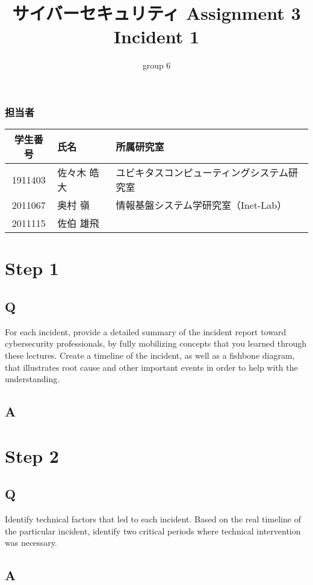 \documentclass[uplatex]{jsarticle}
\title{
    \vspace{-1.5cm}
    サイバーセキュリティ Assignment 3 \\
    Incident 1
}
\author{group 6}
\begin{document}
\maketitle

\subsubsection*{担当者}
\begin{table}[H]
    \begin{tabular}{|c|l|l|}
        \hline
        学生番号 & 氏名 & 所属研究室\\
        \hline\hline
        1911403 & 佐々木 皓大 & ユビキタスコンピューティングシステム研究室\\
        \hline
        2011067 & 奥村 嶺 & 情報基盤システム学研究室（Inet-Lab）\\
        \hline
        2011115 & 佐伯 雄飛 & \\
        \hline
    \end{tabular}
\end{table}

\section*{Step 1}
\subsection*{Q}
For each incident, provide a detailed summary of the incident report toward cybersecurity professionals, by fully mobilizing concepts that you learned through these lectures. Create a timeline of the incident, as well as a fishbone diagram, that illustrates root cause and other important events in order to help with the understanding.
\subsection*{A}

\section*{Step 2}
\subsection*{Q}
Identify technical factors that led to each incident. Based on the real timeline of the particular incident, identify two critical periods where technical intervention was necessary.
\subsection*{A}
\end{document}
